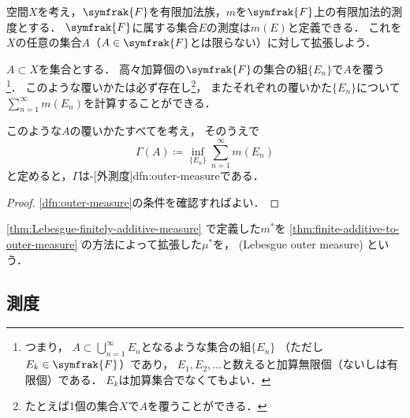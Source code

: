 \documentclass[../sotsu.tex]{subfiles}
\begin{document}
\begin{theorem}
    \label{thm:finite-additive-to-outer-measure}
    空間$X$を考え，$\symfrak{F}$を有限加法族，$m$を$\symfrak{F}$上の有限加法的測度とする．
    $\symfrak{F}$に属する集合$E$の測度は$m(E)$と定義できる．
    これを$X$の任意の集合$A$（$A \in \symfrak{F}$とは限らない）に対して拡張しよう．

    $A \subset X$を集合とする．
    高々加算個の$\symfrak{F}$の集合の組$\{ E_n \}$で$A$を覆う%
    \footnote{
        つまり，
        $\displaystyle A \subset \bigcup_{n=1}^{\infty} E_n$となるような集合の組$ \{ E_n \} $
        （ただし$E_k \in \symfrak{F}$）であり，
        $E_1, E_2, \dotsc$と数えると加算無限個（ないしは有限個）である．
        $E_k$は加算集合でなくてもよい．
    }．
    このような覆いかたは必ず存在し\footnote{たとえば1個の集合$X$で$A$を覆うことができる．}，
    またそれぞれの覆いかた$\{ E_n \}$について
    $\sum_{n=1}^{\infty} m(E_n)$を計算することができる．

    このような$A$の覆いかたすべてを考え，
    そのうえで
    \begin{equation*}
        \Gamma(A)  \coloneq  \inf_{ \{ E_n \} } \sum_{n=1}^{\infty} m(E_n)
    \end{equation*}
    と定めると，$\Gamma$は-[外測度]{dfn:outer-measure}である．
\end{theorem}

\begin{proof}
    \cref{dfn:outer-measure}の条件を確認すればよい．
\end{proof}


\begin{definition}
    \label{dfn:Lebesgue-outer-measure}
    \cref{thm:Lebesgue-finitely-additive-measure}%
    で定義した$m^*$を%
    \cref{thm:finite-additive-to-outer-measure}%
    の方法によって拡張した$\mu^*$を，
    (Lebesgue outer measure)%
    という．
\end{definition}



\subsection{測度}
\end{document}
